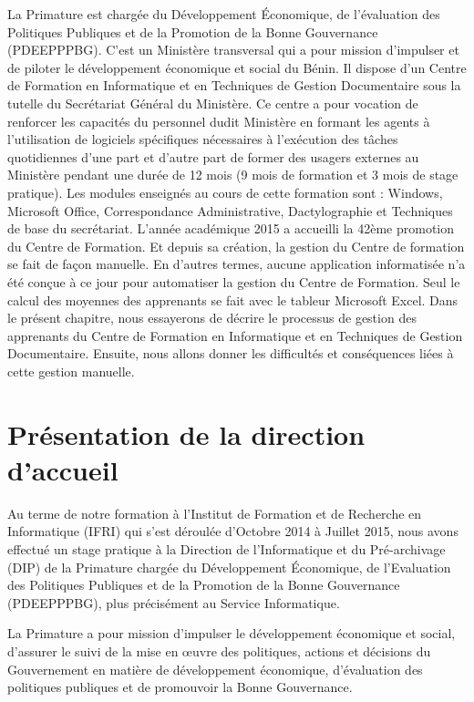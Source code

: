 \introduction 

La Primature est chargée du Développement Économique, de l'évaluation des Politiques Publiques et de la Promotion de la Bonne Gouvernance (PDEEPPPBG). C'est un Ministère transversal qui a pour mission d'impulser et de piloter le développement économique et social du Bénin. Il dispose d'un Centre de Formation en Informatique et en Techniques de Gestion Documentaire sous la tutelle du Secrétariat Général du Ministère. Ce centre a pour vocation de renforcer les capacités du personnel dudit Ministère en formant les agents à l'utilisation de logiciels spécifiques nécessaires à l'exécution des tâches quotidiennes  d'une part et d'autre part de former des usagers externes au Ministère pendant une durée de 12 mois (9 mois de formation et 3 mois de stage pratique). Les modules enseignés au cours de cette formation sont : Windows, Microsoft Office, Correspondance Administrative, Dactylographie et Techniques de base du secrétariat. L'année académique 2015 a accueilli la 42ème promotion du Centre de Formation. Et depuis sa création, la gestion du Centre de formation se fait de façon manuelle. En d'autres termes, aucune application informatisée n'a été conçue à ce jour pour automatiser la gestion du Centre de Formation. Seul le calcul des moyennes des apprenants se fait avec le tableur Microsoft Excel.
Dans le présent chapitre, nous essayerons de décrire le processus de gestion des apprenants du Centre de Formation en Informatique et en Techniques de Gestion Documentaire. Ensuite, nous allons donner les difficultés et conséquences liées à cette gestion manuelle.
\section{Présentation de la direction d'accueil}

Au terme de notre formation à l'Institut de Formation et de Recherche en Informatique (IFRI) qui s'est déroulée d'Octobre 2014 à Juillet 2015, nous avons effectué un stage pratique à la Direction de l'Informatique et du Pré-archivage (DIP) de la Primature chargée du Développement Économique, de l'Evaluation des Politiques Publiques et de la Promotion de la Bonne Gouvernance (PDEEPPPBG), plus précisément au Service Informatique. 

La Primature a pour mission d'impulser le développement économique et social, d'assurer le suivi de la mise en œuvre des politiques, actions et décisions du Gouvernement en matière de développement économique, d'évaluation des politiques publiques et de promouvoir la Bonne Gouvernance.

